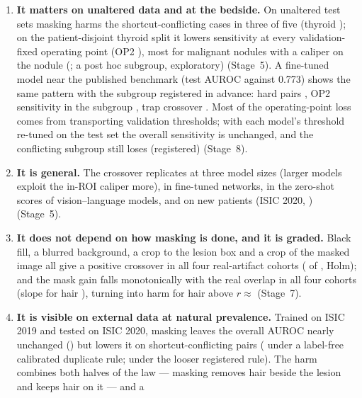 \begin{enumerate}[leftmargin=*]
three feasible cohorts (thyroid \sFourAdjThy), and pasting the same real artifact inside or outside the ROI of the same
images reproduces the location effect in all four cohorts. A neutral paste reproduces most of that transplant effect,
which shows that \emph{any} label-correlated pattern inside the ROI defeats masking; the artifact's own content adds a
significant part for hair and calipers (Stage~4).
\item \textbf{It matters on unaltered data and at the bedside.} On unaltered test sets masking harms the
shortcut-conflicting cases in three of five (thyroid \sFiveNatthyroidhard); on the patient-disjoint thyroid split it lowers
sensitivity at every validation-fixed operating point (OP2 \sFiveSensOPTwo), most for malignant nodules with a caliper on
the nodule (\sFiveConfOPTwo; a post hoc subgroup, exploratory) (Stage~5). A fine-tuned model near the published
benchmark (test AUROC \sEightFTZero{} against 0.773) shows the same pattern with the subgroup registered in advance:
hard pairs \sEightFTOne, OP2 sensitivity in the subgroup \sEightFTThree, trap crossover \sEightFTFour. Most of the
operating-point loss comes from transporting validation thresholds; with each model's threshold re-tuned on the test set the
overall sensitivity is unchanged, and the conflicting subgroup still loses \sEightTMOne{} (registered) (Stage~8).
\item \textbf{It is general.} The crossover replicates at three model sizes (larger models exploit the in-ROI caliper
more), in fine-tuned networks, in the zero-shot scores of vision--language models, and on new patients (ISIC 2020,
\sFiveExtX) (Stage~5).
\item \textbf{It does not depend on how masking is done, and it is graded.} Black fill, a blurred background, a crop
to the lesion box and a crop of the masked image all give a positive crossover in all four real-artifact cohorts
(\sSevenNPrimOK{} of \sSevenNPrim, Holm); and the mask gain falls monotonically with the real overlap in all four
cohorts (slope for hair \sSevenSlopeisic), turning into harm for hair above $r\approx$ \sSevenZeroIsic{} (Stage~7).
\item \textbf{It is visible on external data at natural prevalence.} Trained on ISIC 2019 and tested on ISIC 2020, masking
leaves the overall AUROC nearly unchanged (\sSevenTcalibratedall) but lowers it on shortcut-conflicting pairs
(\sSevenTcalibratedhard{} under a label-free calibrated duplicate rule; \sSevenBmaskermhard{} under the looser registered rule).
The harm combines both halves of the law --- masking removes hair beside the lesion and keeps hair on it --- and a

\end{enumerate}
